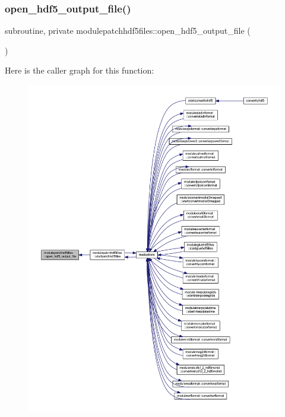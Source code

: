 \subsubsection{\texorpdfstring{open\+\_\+hdf5\+\_\+output\+\_\+file()}{open\_hdf5\_output\_file()}}
{\footnotesize\ttfamily subroutine, private modulepatchhdf5files\+::open\+\_\+hdf5\+\_\+output\+\_\+file (\begin{DoxyParamCaption}{ }\end{DoxyParamCaption})\hspace{0.3cm}{\ttfamily [private]}}

Here is the caller graph for this function\+:\nopagebreak
\begin{figure}[H]
\begin{center}
\leavevmode
\includegraphics[width=350pt]{namespacemodulepatchhdf5files_ad3c3d3284e4aaad5b2b6c70612fbc40b_icgraph}
\end{center}
\end{figure}
\mbox{\label{namespacemodulepatchhdf5files_aa13f313e5bea3ff364240319fb791f70}} 
